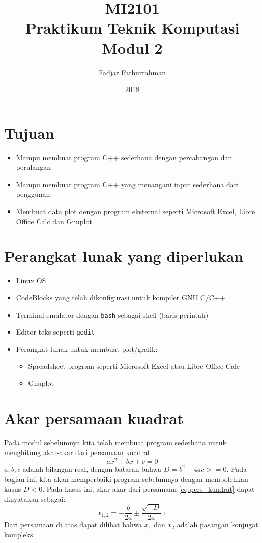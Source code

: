\documentclass[a4paper,11pt]{extarticle}
\title{
MI2101\\
Praktikum Teknik Komputasi\\
Modul 2}
\author{Fadjar Fathurrahman}
\date{2018}
\begin{document}
\maketitle

\section{Tujuan}
\begin{itemize}
\item Mampu membuat program C++ sederhana dengan percabangan dan perulangan
\item Mampu membuat program C++ yang menangani input sederhana dari penggunan
\item Membuat data plot dengan program eksternal seperti \textsf{Microsoft Excel},
\textsf{Libre Office Calc} dan \textsf{Gnuplot}
\end{itemize}

\section{Perangkat lunak yang diperlukan}
\begin{itemize}
\item Linux OS
\item CodeBlocks yang telah dikonfigurasi untuk kompiler GNU C/C++
\item Terminal emulator dengan \texttt{bash} sebagai shell (baris perintah)
\item Editor teks seperti \texttt{gedit}
\item Perangkat lunak untuk membuat plot/grafik:
\begin{itemize}
\item Spreadsheet program seperti \textsf{Microsoft Excel} atau \textsf{Libre Office Calc}
\item \textsf{Gnuplot}
\end{itemize}
\end{itemize}

\section{Akar persamaan kuadrat}
Pada modul sebelumnya kita telah membuat program sederhana untuk menghitung
akar-akar dari persamaan kuadrat
\begin{equation}
ax^2 + bx + c = 0
\label{eq:pers_kuadrat}
\end{equation}
$a, b, c$ adalah bilangan real, dengan batasan bahwa $D = b^2 - 4ac >= 0$.
Pada bagian ini, kita akan memperbaiki program sebelumnya dengan
membolehkan kasus $D < 0$. Pada kasus ini, akar-akar dari persamaan
\ref{eq:pers_kuadrat} dapat dinyatakan sebagai:
\begin{equation}
x_{1,2} = -\frac{b}{2a} \pm \frac{\sqrt{-D}}{2a}\imath
\end{equation}
Dari persamaan di atas dapat dilihat bahwa $x_{1}$ dan $x_{2}$ adalah
pasangan konjugat kompleks.
\end{document}
